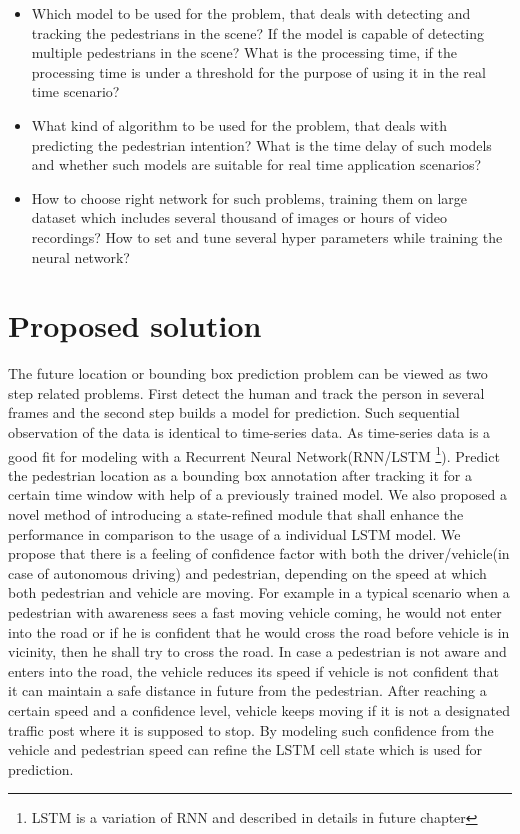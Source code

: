 \begin{itemize}
	\item Which model to be used for the problem, that deals with detecting and tracking the pedestrians in the scene? If the model is capable of detecting multiple pedestrians in the scene? What is the processing time, if the processing time is under a threshold for the purpose of using it in the real time scenario?

	\item 
What kind of algorithm to be used for the problem, that deals with predicting the pedestrian intention? What is the time delay of such models and whether such models are suitable for real time application scenarios?

	\item How to choose right network for such problems, training them on large dataset which includes several thousand of images or hours of video recordings? How to set and tune several hyper parameters while training the neural network? 

\end{itemize}


\section{Proposed solution}
The future location or bounding box prediction problem can be viewed as two step related problems. First detect the human and track the person in several frames and the second step builds a model for prediction. Such sequential observation of the data is identical to time-series data. As time-series data is a good fit for modeling with a Recurrent Neural Network(RNN/LSTM \footnote{LSTM is a variation of RNN and described in details in future chapter}). Predict the pedestrian location as a bounding box annotation after tracking it for a certain time window with help of a previously trained model. We also proposed a novel method of introducing a state-refined module that shall enhance the performance in comparison to the usage of a individual LSTM model. We propose that there is a feeling of confidence factor with both the driver/vehicle(in case of autonomous driving) and pedestrian, depending on the speed at which both pedestrian and vehicle are moving. For example in a typical scenario when a pedestrian with awareness sees a fast moving vehicle coming, he would not enter into the road or if he is confident that he would cross the road before vehicle is in vicinity, then he shall try to cross the road. In case a pedestrian is not aware and enters into the road, the vehicle reduces its speed if vehicle is not confident that it can maintain a safe distance in future from the pedestrian. After reaching a certain speed and a confidence level, vehicle keeps moving if it is not a designated traffic post where it is supposed to stop. By modeling such confidence from the vehicle and pedestrian speed can refine the LSTM cell state which is used for prediction.

